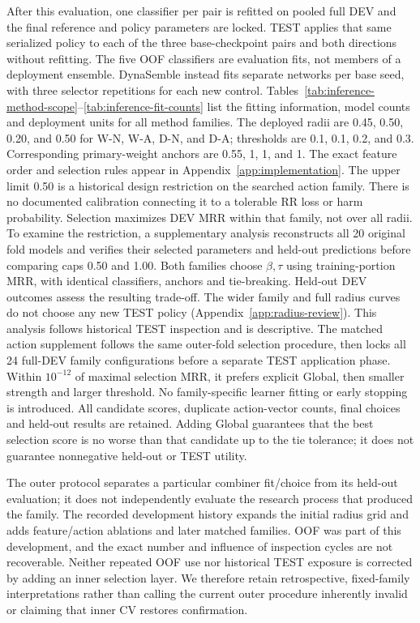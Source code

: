 \documentclass[11pt,a4paper]{article}
\begin{document}
After this evaluation, one classifier per pair is refitted on pooled full DEV and the final reference and policy parameters are locked. TEST applies that same serialized policy to each of the three base-checkpoint pairs and both directions without refitting. The five OOF classifiers are evaluation fits, not members of a deployment ensemble. DynaSemble instead fits separate networks per base seed, with three selector repetitions for each new control. Tables~\ref{tab:inference-method-scope}--\ref{tab:inference-fit-counts} list the fitting information, model counts and deployment units for all method families. The deployed radii are 0.45, 0.50, 0.20, and 0.50 for W-N, W-A, D-N, and D-A; thresholds are 0.1, 0.1, 0.2, and 0.3. Corresponding primary-weight anchors are 0.55, 1, 1, and 1. The exact feature order and selection rules appear in Appendix~\ref{app:implementation}.
The upper limit 0.50 is a historical design restriction on the searched action family. There is no documented calibration connecting it to a tolerable RR loss or harm probability. Selection maximizes DEV MRR within that family, not over all radii. To examine the restriction, a supplementary analysis reconstructs all 20 original fold models and verifies their selected parameters and held-out predictions before comparing caps 0.50 and 1.00. Both families choose $\beta,\tau$ using training-portion MRR, with identical classifiers, anchors and tie-breaking. Held-out DEV outcomes assess the resulting trade-off. The wider family and full radius curves do not choose any new TEST policy (Appendix~\ref{app:radius-review}). This analysis follows historical TEST inspection and is descriptive.
The matched action supplement follows the same outer-fold selection procedure, then locks all 24 full-DEV family configurations before a separate TEST application phase. Within $10^{-12}$ of maximal selection MRR, it prefers explicit Global, then smaller strength and larger threshold. No family-specific learner fitting or early stopping is introduced. All candidate scores, duplicate action-vector counts, final choices and held-out results are retained. Adding Global guarantees that the best selection score is no worse than that candidate up to the tie tolerance; it does not guarantee nonnegative held-out or TEST utility.

The outer protocol separates a particular combiner fit/choice from its held-out evaluation; it does not independently evaluate the research process that produced the family. The recorded development history expands the initial radius grid and adds feature/action ablations and later matched families. OOF was part of this development, and the exact number and influence of inspection cycles are not recoverable. Neither repeated OOF use nor historical TEST exposure is corrected by adding an inner selection layer. We therefore retain retrospective, fixed-family interpretations rather than calling the current outer procedure inherently invalid or claiming that inner CV restores confirmation.
\end{document}
